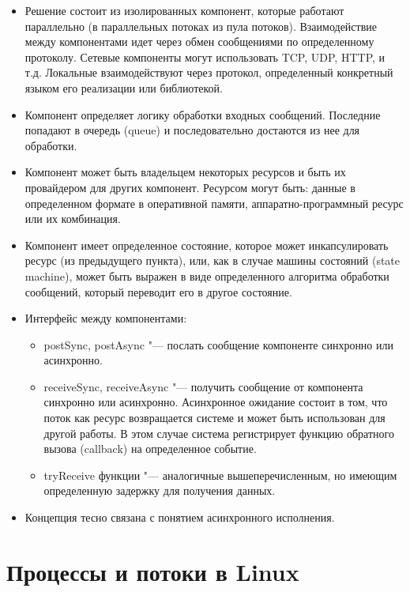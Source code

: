 \documentclass[bachelor, och, book]{SCWorks}
\theoremstyle{remark}
\begin{document}
    \begin{itemize}[label=$\bullet$]
        \item Решение состоит из изолированных компонент, которые работают параллельно (в параллельных потоках из пула потоков). Взаимодействие между компонентами идет через обмен сообщениями по определенному протоколу. Сетевые компоненты могут использовать TCP, UDP, HTTP, и т.д. Локальные взаимодействуют через протокол, определенный конкретный языком его реализации или библиотекой.
        \item Компонент определяет логику обработки входных сообщений. Последние попадают в очередь (queue) и последовательно достаются из нее для обработки.
        \item Компонент может быть владельцем некоторых ресурсов и быть их провайдером для других компонент. Ресурсом могут быть: данные в определенном формате в оперативной памяти, аппаратно-программный ресурс или их комбинация.
        \item Компонент имеет определенное состояние, которое может инкапсулировать ресурс (из предыдущего пункта), или, как в случае машины состояний (state machine), может быть выражен в виде определенного алгоритма обработки сообщений, который переводит его в другое состояние.
        \item Интерфейс между компонентами:
            \begin{itemize}
                \item postSync, postAsync "--- послать сообщение компоненте синхронно или асинхронно.
                \item receiveSync, receiveAsync "--- получить сообщение от компонента синхронно или асинхронно. Асинхронное ожидание состоит в том, что поток как ресурс возвращается системе и может быть использован для другой работы. В этом случае система регистрирует функцию обратного вызова (callback) на определенное событие.
                \item tryReceive функции "--- аналогичные вышеперечисленным, но имеющим определенную задержку для получения данных.
            \end{itemize}
        \item Концепция тесно связана с понятием асинхронного исполнения.
    \end{itemize}

    \section{Процессы и потоки в Linux}
\end{document}
